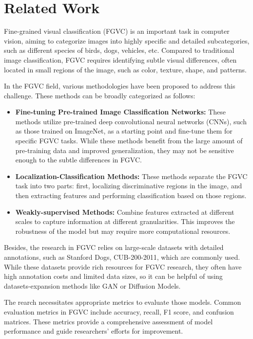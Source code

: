 \section{Related Work}
\label{sec:related_work}

Fine-grained visual classification (FGVC) is an important task in computer vision, aiming to categorize images into highly specific and detailed subcategories, such as different species of birds, dogs, vehicles, etc. Compared to traditional image classification, FGVC requires identifying subtle visual differences, often located in small regions of the image, such as color, texture, shape, and patterns.

In the FGVC field, various methodologies have been proposed to address this challenge. These methods can be broadly categorized as follows:
\begin{itemize}
    \item \textbf{Fine-tuning Pre-trained Image Classification Networks:} These methods utilize pre-trained deep convolutional neural networks (CNNs), such as those trained on ImageNet, as a starting point and fine-tune them for specific FGVC tasks. While these methods benefit from the large amount of pre-training data and improved generalization, they may not be sensitive enough to the subtle differences in FGVC.
    \item \textbf{Localization-Classification Methods:} These methods separate the FGVC task into two parts: first, localizing discriminative regions in the image, and then extracting features and performing classification based on those regions.
    \item \textbf{Weakly-supervised Methods:} Combine features extracted at different scales to capture information at different granularities. This improves the robustness of the model but may require more computational resources.
\end{itemize}

Besides, the research in FGVC relies on large-scale datasets with detailed annotations, such as Stanford Dogs, CUB-200-2011, which are commonly used. While these datasets provide rich resources for FGVC research, they often have high annotation costs and limited data sizes, so it can be helpful of using datasets-expansion methods like GAN or Diffusion Models.

The rearch necessitates appropriate metrics to evaluate those models. Common evaluation metrics in FGVC include accuracy, recall, F1 score, and confusion matrices. These metrics provide a comprehensive assessment of model performance and guide researchers' efforts for improvement.


